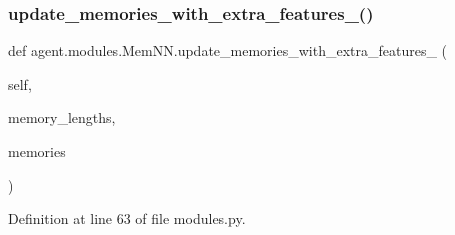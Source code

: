 \subsubsection{\texorpdfstring{update\+\_\+memories\+\_\+with\+\_\+extra\+\_\+features\+\_\+()}{update\_memories\_with\_extra\_features\_()}}
{\footnotesize\ttfamily def agent.\+modules.\+Mem\+N\+N.\+update\+\_\+memories\+\_\+with\+\_\+extra\+\_\+features\+\_\+ (\begin{DoxyParamCaption}\item[{}]{self,  }\item[{}]{memory\+\_\+lengths,  }\item[{}]{memories }\end{DoxyParamCaption})}



Definition at line 63 of file modules.\+py.



